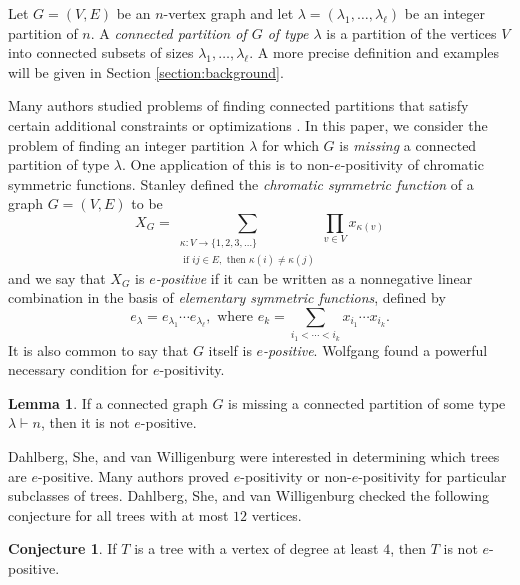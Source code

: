 \documentclass[12pt]{amsart}  %
\theoremstyle{definition}
\newtheorem{lemma}[theorem]{Lemma}
\newtheorem{conjecture}[theorem]{Conjecture}
\theoremstyle{remark}
\numberwithin{equation}{section}
\begin{document}
Let $G=(V,E)$ be an $n$-vertex graph and let $\lambda=(\lambda_1,\ldots,\lambda_\ell)$ be an integer partition of $n$. A \emph{connected partition of $G$ of type $\lambda$} is a partition of the vertices $V$ into connected subsets of sizes $\lambda_1,\ldots,\lambda_\ell$. A more precise definition and examples will be given in Section \ref{section:background}.

Many authors studied problems of finding connected partitions that satisfy certain additional constraints or optimizations \cite{fairdiv, balconpar, balgraphpar, parcon, highlyconpar, doublypar}. In this paper, we consider the problem of finding an integer partition $\lambda$ for which $G$ is \emph{missing} a connected partition of type $\lambda$. One application of this is to non-$e$-positivity of chromatic symmetric functions. Stanley \cite{chromsym} defined the \emph{chromatic symmetric function} of a graph $G=(V,E)$ to be
\begin{equation*}
X_G=\sum_{\substack{\kappa:V\to\{1,2,3,\ldots\}\\\text{ if }ij\in E,\text{ then }\kappa(i)\neq\kappa(j)}}\prod_{v\in V}x_{\kappa(v)}
\end{equation*} 
and we say that $X_G$ is \emph{$e$-positive} if it can be written as a nonnegative linear combination in the basis of \emph{elementary symmetric functions}, defined by
\begin{equation*}
e_\lambda=e_{\lambda_1}\cdots e_{\lambda_\ell},\text{ where }e_k=\sum_{i_1<\cdots<i_k}x_{i_1}\cdots x_{i_k}.
\end{equation*}
It is also common to say that $G$ itself is \emph{$e$-positive}. Wolfgang found a powerful necessary condition for $e$-positivity.

\begin{lemma} \cite[Proposition 1.3.3]{conparts} If a connected graph $G$ is missing a connected partition of some type $\lambda\vdash n$, then it is not $e$-positive.
\end{lemma}

Dahlberg, She, and van Willigenburg \cite{chromspostrees} were interested in determining which trees are $e$-positive. Many authors \cite{eposclawcon, chromspostrees, spider4m22m1, spiderbroom, spiderepos} proved $e$-positivity or non-$e$-positivity for particular subclasses of trees. Dahlberg, She, and van Willigenburg checked the following conjecture for all trees with at most $12$ vertices.

\begin{conjecture}\label{conj:four}
\cite[Conjecture 6.1]{chromspostrees} If $T$ is a tree with a vertex of degree at least $4$, then $T$ is not $e$-positive.
\end{conjecture} 
\end{document}
